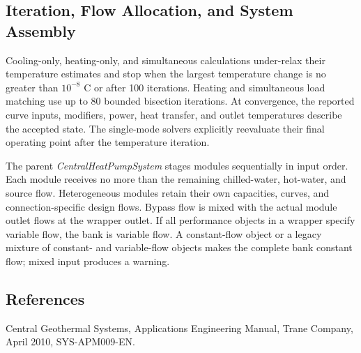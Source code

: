 \subsection{Iteration, Flow Allocation, and System Assembly}
\label{iteration-flow-allocation-and-system-assembly}

Cooling-only, heating-only, and simultaneous calculations under-relax their temperature estimates and stop when the largest temperature change is no greater than \(10^{-8}\) C or after 100 iterations. Heating and simultaneous load matching use up to 80 bounded bisection iterations. At convergence, the reported curve inputs, modifiers, power, heat transfer, and outlet temperatures describe the accepted state. The single-mode solvers explicitly reevaluate their final operating point after the temperature iteration.

The parent \emph{CentralHeatPumpSystem} stages modules sequentially in input order. Each module receives no more than the remaining chilled-water, hot-water, and source flow. Heterogeneous modules retain their own capacities, curves, and connection-specific design flows. Bypass flow is mixed with the actual module outlet flows at the wrapper outlet. If all performance objects in a wrapper specify variable flow, the bank is variable flow. A constant-flow object or a legacy mixture of constant- and variable-flow objects makes the complete bank constant flow; mixed input produces a warning.

\subsection{References}
\label{references-008}

Central Geothermal Systems, Applications Engineering Manual, Trane Company, April 2010, SYS-APM009-EN.
